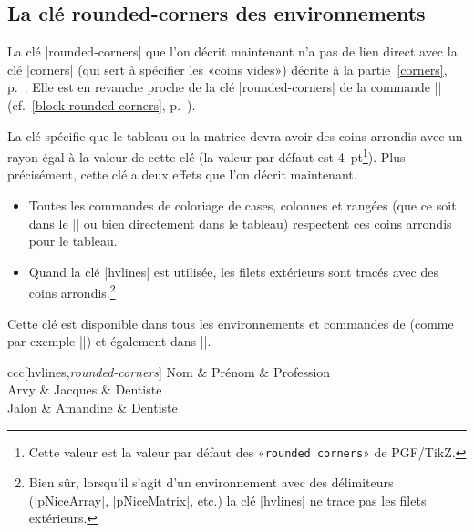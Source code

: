 \documentclass[dvipsnames]{article}
\begin{document}
\subsection{La clé rounded-corners des environnements}

\label{tabular-rounded-corners}

La clé |rounded-corners| que l'on décrit maintenant n'a pas de lien direct avec
la clé |corners| (qui sert à spécifier les «coins vides») décrite à la
partie~\ref{corners}, p.~\pageref{corners}. Elle est en revanche proche de la clé
|rounded-corners| de la commande |\Block| (cf.~\ref{block-rounded-corners},
p.~\pageref{block-rounded-corners}).

\smallskip
La clé  spécifie que le tableau ou la matrice devra avoir des
coins arrondis avec un rayon égal à la valeur de cette clé (la valeur par défaut est
4~pt\footnote{Cette valeur est la valeur par défaut des «\texttt{rounded
    corners}» de PGF/TikZ.}). Plus précisément, cette clé a deux effets que l'on
décrit maintenant.
\begin{itemize}[beginpenalty=10000]
\item Toutes les commandes de coloriage de cases, colonnes et rangées (que ce
soit dans le |\CodeBefore| ou bien directement dans le tableau) respectent ces
coins arrondis pour le tableau. 

\item Quand la clé |hvlines| est utilisée, les filets extérieurs sont tracés
avec des coins arrondis.\footnote{Bien sûr, lorsqu'il s'agit d'un environnement
  avec des délimiteurs (|{pNiceArray}|, |{pNiceMatrix}|, etc.) la clé
  |hvlines| ne trace pas les filets extérieurs.}
\end{itemize}

\bigskip
Cette clé est disponible dans tous les environnements et commandes de
 (comme par exemple |\pAutoNiceMatrix|) et également dans
|\NiceMatrixOptions|.

\bigskip
\begin{Code}[width=9.5cm,show-output,no-cell-nodes]
\begin{NiceTabular}{ccc}[hvlines,\emph{rounded-corners}]
\CodeBefore
\Body
  Nom & Prénom & Profession \\
  Arvy & Jacques & Dentiste \\
  Jalon & Amandine & Dentiste \\
\end{NiceTabular}
\end{Code}
\end{document}
